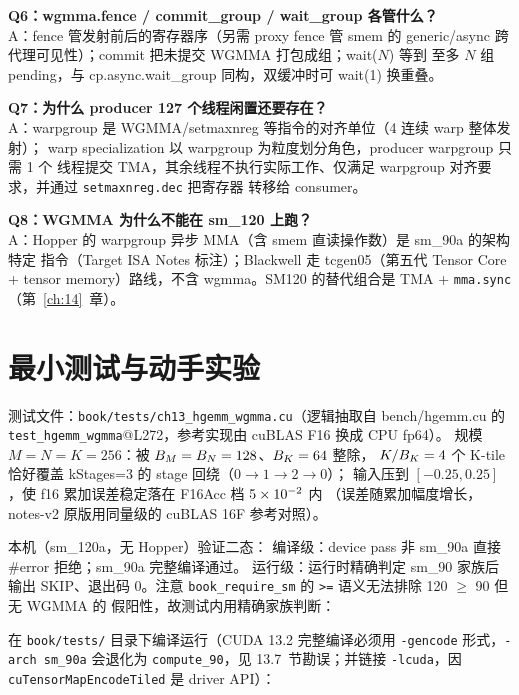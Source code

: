 \textbf{Q6：wgmma.fence / commit\_group / wait\_group 各管什么？}\\
A：fence 管发射前后的寄存器序（另需 proxy fence 管 smem 的
generic/async 跨代理可见性）；commit 把未提交 WGMMA 打包成组；wait($N$) 等到
至多 $N$ 组 pending，与 cp.async.wait\_group 同构，双缓冲时可 wait(1) 换重叠。

\textbf{Q7：为什么 producer 127 个线程闲置还要存在？}\\
A：warpgroup 是 WGMMA/setmaxnreg 等指令的对齐单位（4 连续 warp 整体发射）；
warp specialization 以 warpgroup 为粒度划分角色，producer warpgroup 只需 1 个
线程提交 TMA，其余线程不执行实际工作、仅满足 warpgroup 对齐要求，并通过 \texttt{setmaxnreg.\allowbreak{}dec} 把寄存器
转移给 consumer。

\textbf{Q8：WGMMA 为什么不能在 sm\_120 上跑？}\\
A：Hopper 的 warpgroup 异步 MMA（含 smem 直读操作数）是 sm\_90a 的架构特定
指令（Target ISA Notes 标注）；Blackwell 走 tcgen05（第五代 Tensor Core +
tensor memory）路线，不含 wgmma。SM120 的替代组合是 TMA + \texttt{mma.sync}
（第~\ref{ch:14}~章）。

\section{最小测试与动手实验}

测试文件：\texttt{book/\allowbreak{}tests/\allowbreak{}ch13\_\allowbreak{}hgemm\_\allowbreak{}wgmma.cu}（逻辑抽取自 bench/hgemm.cu 的
\texttt{test\_\allowbreak{}hgemm\_\allowbreak{}wgmma}@L272，参考实现由 cuBLAS F16 换成 CPU fp64）。
规模 $M = N = K = 256$：被 $B\sb{M} = B\sb{N} = 128$、$B\sb{K} = 64$ 整除，
$K / B\sb{K} = 4$ 个 K-tile 恰好覆盖 kStages=3 的 stage 回绕（$0 \to 1 \to 2 \to 0$）；
输入压到 $[-0.25, 0.25]$，使 f16 累加误差稳定落在 F16Acc 档 $5 \times 10\sp{-2}$ 内
（误差随累加幅度增长，notes-v2 原版用同量级的 cuBLAS 16F 参考对照）。

本机（sm\_120a，无 Hopper）验证二态：
编译级：device pass 非 sm\_90a 直接 \#error 拒绝；sm\_90a 完整编译通过。
运行级：运行时精确判定 sm\_90 家族后输出 SKIP、退出码 0。注意
\texttt{book\_\allowbreak{}require\_\allowbreak{}sm} 的 \texttt{>=} 语义无法排除 120 $\ge$ 90 但无 WGMMA 的
假阳性，故测试内用精确家族判断：

在 \texttt{book/tests/} 目录下编译运行（CUDA 13.2 完整编译必须用 \texttt{-gencode}
形式，\texttt{-arch sm\_90a} 会退化为 \texttt{compute\_90}，见 13.7~节勘误；并链接
\texttt{-lcuda}，因 \texttt{cu\allowbreak{}Tensor\allowbreak{}Map\allowbreak{}Encode\allowbreak{}Tiled} 是 driver API）：

